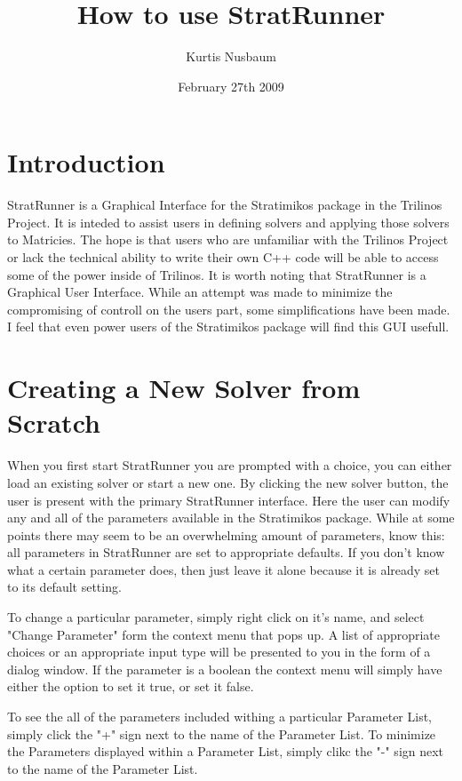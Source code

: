 \documentclass{article}
\title{How to use StratRunner}
\author{Kurtis Nusbaum}
\date{February 27th 2009}
\begin{document}
\maketitle

\section{Introduction}
StratRunner is a Graphical Interface for the Stratimikos package in the Trilinos Project. It is inteded to assist users in defining solvers
and applying those solvers to Matricies. The hope is that users who are unfamiliar with the Trilinos Project or lack the technical ability
to write their own C++ code will be able to access some of the power inside of Trilinos. It is worth noting that StratRunner is a Graphical User
Interface. While an attempt was made to minimize the compromising of controll on the users part, some simplifications have been made. I feel that even
power users of the Stratimikos package will find this GUI usefull.

\section{Creating a New Solver from Scratch}

When you first start StratRunner you are prompted with a choice, you can either load an existing solver or start a new one. By clicking the new solver
button, the user is present with the primary StratRunner interface. Here the user can modify any and all of the parameters available in the Stratimikos
package. While at some points there may seem to be an overwhelming amount of parameters, know this: all parameters in StratRunner are set to appropriate 
defaults. If you don't know what a certain parameter does, then just leave it alone because it is already set to its default setting.

To change a particular parameter, simply right click on it's name, and select "Change Parameter" form the context menu that pops up. A list of
appropriate choices or an appropriate input type will be presented to you in the form of a dialog window. If the parameter is a boolean the context
menu will simply have either the option to set it true, or set it false.

To see the all of the parameters included withing a particular Parameter List, simply click the "+" sign next to the name of the Parameter List. To
minimize the Parameters displayed within a Parameter List, simply clikc the "-" sign next to the name of the Parameter List.
\end{document}
